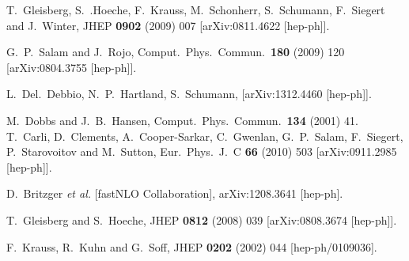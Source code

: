 \documentclass[11pt]{article}
\begin{document}
\begin{thebibliography}{99}


  T.~Gleisberg, S.~.Hoeche, F.~Krauss, M.~Schonherr, S.~Schumann, F.~Siegert and J.~Winter,
  JHEP {\bf 0902} (2009) 007
  [arXiv:0811.4622 [hep-ph]].
  
  G.~P.~Salam and J.~Rojo,
  Comput.\ Phys.\ Commun.\  {\bf 180} (2009) 120
  [arXiv:0804.3755 [hep-ph]].

  L.~Del.~Debbio, N.~P.~Hartland, S.~Schumann, [arXiv:1312.4460 [hep-ph]].
  
  M.~Dobbs and J.~B.~Hansen,
  Comput.\ Phys.\ Commun.\  {\bf 134} (2001) 41.\\
  
  T.~Carli, D.~Clements, A.~Cooper-Sarkar, C.~Gwenlan, G.~P.~Salam, F.~Siegert, P.~Starovoitov and M.~Sutton,
  Eur.\ Phys.\ J.\ C {\bf 66} (2010) 503
  [arXiv:0911.2985 [hep-ph]].
  
  D.~Britzger {\it et al.}  [fastNLO Collaboration],
  arXiv:1208.3641 [hep-ph].
  
  T.~Gleisberg and S.~Hoeche,
  JHEP {\bf 0812} (2008) 039
  [arXiv:0808.3674 [hep-ph]].

  F.~Krauss, R.~Kuhn and G.~Soff,
  JHEP {\bf 0202} (2002) 044
  [hep-ph/0109036].
  
\end{thebibliography}
\end{document}
